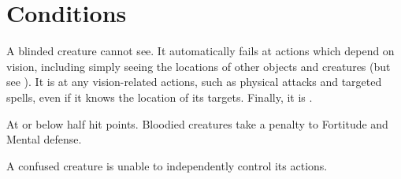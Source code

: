 \chapter{Conditions}\label{Conditions}



 A blinded creature cannot see. It automatically fails at actions which depend on vision, including simply seeing the locations of other objects and creatures (but see ). It is \severelyimpaired at any vision-related actions, such as physical attacks and targeted spells, even if it knows the location of its targets. Finally, it is .


 At or below half hit points. Bloodied creatures take a  penalty to Fortitude and Mental defense.


 A confused creature is unable to independently control its actions. \confusionexplanation

